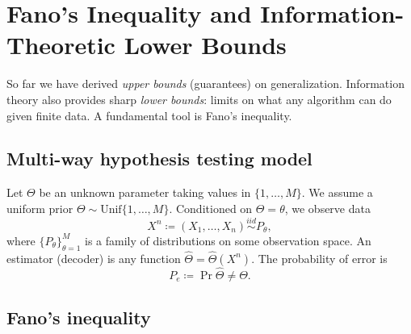 \documentclass{article}
\numberwithin{equation}{section}
\newcommand{\iid}{\stackrel{iid}{\sim}}
\begin{document}
\section{Fano's Inequality and Information-Theoretic Lower Bounds}
\label{sec:fano}

So far we have derived \emph{upper bounds} (guarantees) on generalization.
Information theory also provides sharp \emph{lower bounds}: limits on what any algorithm can do given finite data.
A fundamental tool is Fano's inequality.

\subsection{Multi-way hypothesis testing model}

Let $\Theta$ be an unknown parameter taking values in $\{1,\dots,M\}$.
We assume a uniform prior $\Theta\sim\mathrm{Unif}\{1,\dots,M\}$.
Conditioned on $\Theta=\theta$, we observe data
\begin{equation}
    X^n \coloneqq (X_1,\dots,X_n) \iid P_\theta,
\end{equation}
where $\{P_\theta\}_{\theta=1}^M$ is a family of distributions on some observation space.
An estimator (decoder) is any function $\hat\Theta=\hat\Theta(X^n)$.
The probability of error is
\begin{equation}
    P_e \coloneqq \Pr{\hat\Theta\neq \Theta}.
\end{equation}

\subsection{Fano's inequality}
\end{document}
